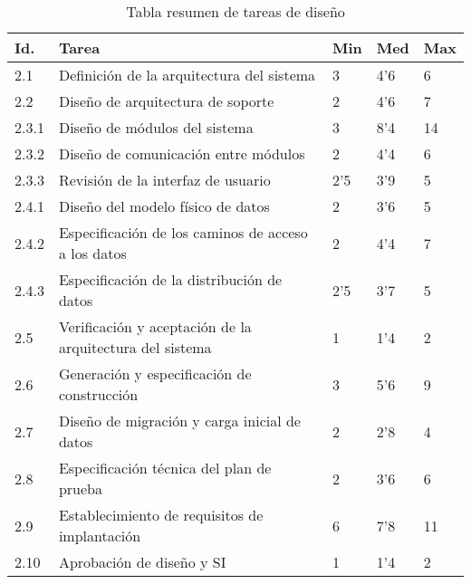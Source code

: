 \documentclass[11pt,a4paper,spanish,twoside]{report}
\begin{document}
\begin{table}[!h]
\centering
  \begin{tabular}{|p{0.8cm}||p{8cm}||p{0.75cm}|p{0.75cm}|p{0.75cm}|}
    \hline
    \textbf{Id.} & \textbf{Tarea} & \textbf{Min} &
    \textbf{Med} & \textbf{Max}\\
    \hline
    2.1 & Definición de la arquitectura del sistema & 3 & 4'6 & 6 \\
    \hline
    2.2 & Diseño de arquitectura de soporte & 2 & 4'6 & 7 \\
    \hline
    2.3.1 & Diseño de módulos del sistema & 3 & 8'4 & 14 \\
    \hline
    2.3.2 & Diseño de comunicación entre módulos & 2 & 4'4 & 6 \\
    \hline
    2.3.3 & Revisión de la interfaz de usuario &2'5 & 3'9 & 5 \\
    \hline
    2.4.1 & Diseño del modelo físico de datos & 2 & 3'6 & 5 \\
    \hline
    2.4.2 & Especificación de los caminos de acceso a los datos & 2 & 4'4 &
    7\\
    \hline
    2.4.3 & Especificación de la distribución de datos & 2'5 & 3'7 & 5 \\
    \hline
    2.5 & Verificación y aceptación de la arquitectura del sistema & 1 & 1'4
    & 2 \\
    \hline
    2.6 & Generación y especificación de construcción & 3 & 5'6 & 9 \\
    \hline
    2.7 & Diseño de migración y carga inicial de datos & 2 & 2'8 & 4 \\
    \hline
    2.8 & Especificación técnica del plan de prueba & 2 & 3'6 & 6 \\
    \hline
    2.9 & Establecimiento de requisitos de implantación & 6 & 7'8 & 11 \\
    \hline
    2.10 & Aprobación de diseño y SI & 1 & 1'4 & 2 \\
    \hline
  \end{tabular}
  \caption{Tabla resumen de tareas de diseño} \label{Tab:tareas2}
\end{table}
\end{document}

